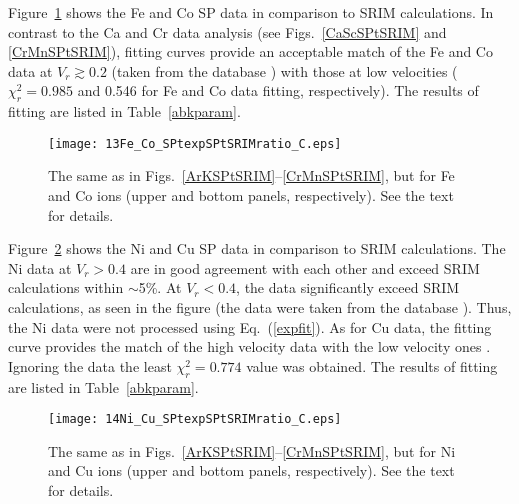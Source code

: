 \documentclass[aps,pra,twocolumn,amsmath,amssymb,floatfix]{revtex4-2}
\begin{document}
Figure~\ref{FeCoSPtSRIM} shows the Fe and Co SP data \cite{Zhang2002,Hvelp68,ShyKum96,Harikumar96,Harikumar97} in comparison to SRIM calculations. In contrast to the Ca and Cr data analysis (see Figs.~\ref{CaScSPtSRIM} and \ref{CrMnSPtSRIM}), fitting curves provide an acceptable match of the Fe and Co data at $V_{r} \gtrsim 0.2$ \cite{Zhang2002} (taken from the database \cite{IAEASP}) with those at low velocities \cite{Hvelp68} ($\chi^{2}_{r} = 0.985$ and 0.546 for Fe and Co data fitting, respectively). The results of fitting are listed in Table~\ref{abkparam}.

\begin{figure}[!h]   %
\begin{center}
\texttt{[image: 13Fe\_Co\_SPtexpSPtSRIMratio\_C.eps]}
\caption{\label{FeCoSPtSRIM} The same as in Figs.~\ref{ArKSPtSRIM}--\ref{CrMnSPtSRIM}, but for Fe and Co ions (upper and bottom panels, respectively). See the text for details.}
\end{center}
\end{figure}

Figure~\ref{NiCuSPtSRIM} shows the Ni and Cu SP data \cite{Zhang2002,Hvelp68,AnthLanf82,Abdess92,Sharma99,ShyKum96,Harikumar96,Harikumar97} in comparison to SRIM calculations. The Ni data \cite{AnthLanf82,Harikumar97} at $V_{r} > 0.4$ are in good agreement with each other and exceed SRIM calculations within $\sim$5\%. At $V_{r} < 0.4$, the data \cite{Zhang2002,Harikumar97} significantly exceed SRIM calculations, as seen in the figure (the data \cite{Zhang2002} were taken from the database \cite{IAEASP}). Thus, the Ni data were not processed using Eq.~(\ref{expfit}). As for Cu data, the fitting curve provides the match of the high velocity data \cite{Zhang2002,Hvelp68,AnthLanf82,Abdess92,Sharma99,ShyKum96,Harikumar97} with the low velocity ones \cite{Hvelp68}. Ignoring the data \cite{Lennard86} the least $\chi^{2}_{r} = 0.774$ value was obtained. The results of fitting are listed in Table~\ref{abkparam}.

\begin{figure}[!h]   %
\begin{center}
\texttt{[image: 14Ni\_Cu\_SPtexpSPtSRIMratio\_C.eps]}
\caption{\label{NiCuSPtSRIM} The same as in Figs.~\ref{ArKSPtSRIM}--\ref{CrMnSPtSRIM}, but for Ni and Cu ions (upper and bottom panels, respectively). See the text for details.}
\end{center}
\end{figure}
\end{document}
